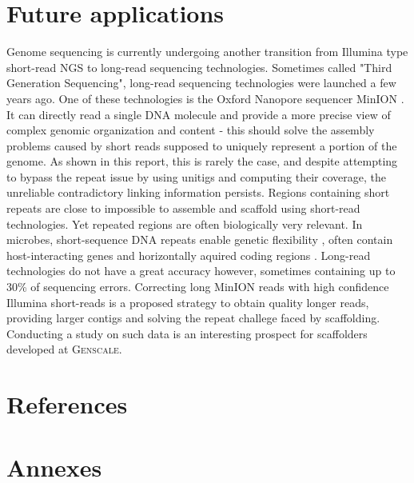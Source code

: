 \documentclass[12pt]{article}
\begin{document}
\section*{Future applications}\label{sec:persp}
Genome sequencing is currently undergoing another transition from Illumina type short-read NGS to long-read sequencing technologies. Sometimes called "Third Generation Sequencing", long-read sequencing technologies were launched a few years ago. One of these technologies is the Oxford Nanopore sequencer MinION \cite{ashton_minion_2015, madoui_genome_2015}. It can directly read a single DNA molecule and provide a more precise view of complex genomic organization and content - this should solve the assembly problems caused by short reads supposed to uniquely represent a portion of the genome. As shown in this report, this is rarely the case, and despite attempting to bypass the repeat issue by using unitigs and computing their coverage, the unreliable contradictory linking information persists. Regions containing short repeats are close to impossible to assemble and scaffold using short-read technologies. Yet repeated regions are often biologically very relevant. In microbes, short-sequence DNA repeats enable genetic flexibility \cite{van_belkum_short-sequence_1998}, often contain host-interacting genes and horizontally aquired coding regions \cite{wiedenbeck_origins_2011}. Long-read technologies do not have a great accuracy however, sometimes containing up to 30\% of sequencing errors. Correcting long MinION reads with high confidence Illumina short-reads is a proposed strategy to obtain quality longer reads, providing larger contigs and solving the repeat challege faced by scaffolding. Conducting a study on such data is an interesting prospect for scaffolders developed at \textsc{Genscale}.

\clearpage

\section*{References}


\newpage
\section*{Annexes}
\label{sec:anx}
\setcounter{figure}{0}
\renewcommand{\thefigure}{\Alph{figure}}
\end{document}
